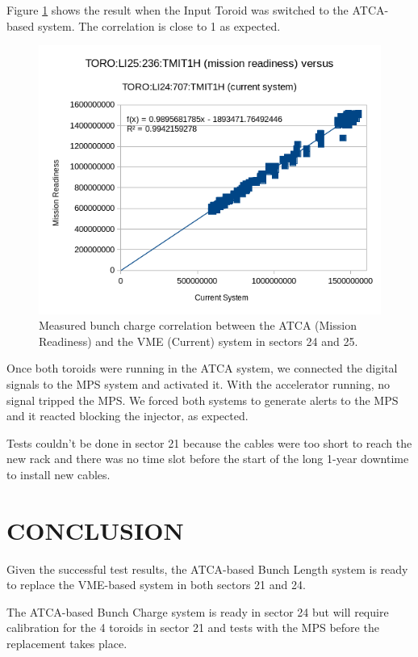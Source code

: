 \documentclass[letter,
        biblatex,   %
        keeplastbox,  %
        ]{jacow}
\begin{document}
Figure \ref{fig:bcm_result} shows the result when the Input Toroid was switched to the ATCA-based system. The correlation is close to 1 as expected.

\begin{figure}[!htb]
  \centering
  \includegraphics*[width=\columnwidth]{bcm_result}
  \caption{Measured bunch charge correlation between the ATCA (Mission Readiness) and the VME (Current) system in sectors 24 and 25.}
  \label{fig:bcm_result}
\end{figure}

Once both toroids were running in the ATCA system, we connected the digital signals to the MPS system and activated it. With the accelerator running, no signal tripped the MPS. We forced both systems to generate alerts to the MPS and it reacted blocking the injector, as expected.

Tests couldn't be done in sector 21 because the cables were too short to reach the new rack and there was no time slot before the start of the long 1-year downtime to install new cables.

\section{CONCLUSION}
Given the successful test results, the ATCA-based Bunch Length system is ready to replace the VME-based system in both sectors 21 and 24.

The ATCA-based Bunch Charge system is ready in sector 24 but will require calibration for the 4 toroids in sector 21 and tests with the MPS before the replacement takes place.
\end{document}
